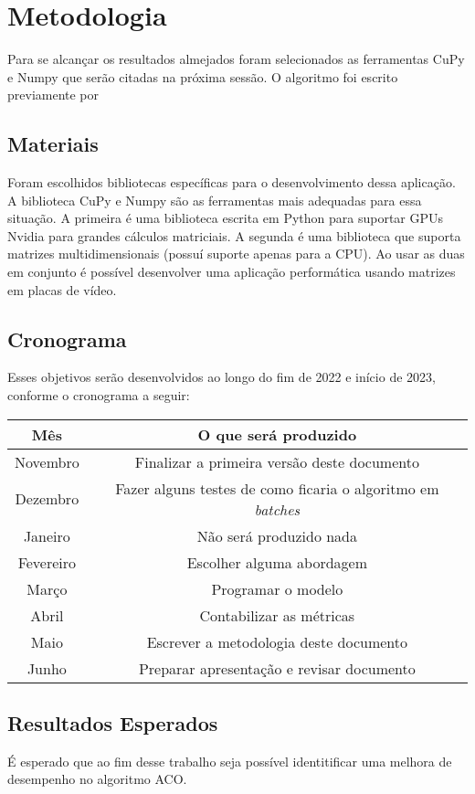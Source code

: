 \section{Metodologia}

Para se alcançar os resultados almejados foram selecionados as ferramentas CuPy e Numpy que serão citadas
na próxima sessão. O algoritmo foi escrito previamente por 

\subsection{Materiais}

Foram escolhidos bibliotecas específicas para o desenvolvimento dessa aplicação.
A biblioteca CuPy\cite{cupyLib} e Numpy\cite{numpyLib} são as ferramentas mais adequadas
para essa situação. A primeira é uma biblioteca escrita em Python para suportar GPUs Nvidia
para grandes cálculos matriciais. A segunda é uma biblioteca que suporta matrizes multidimensionais
(possuí suporte apenas para a CPU). Ao usar as duas em conjunto é possível desenvolver uma aplicação
performática usando matrizes em placas de vídeo.

\subsection{Cronograma}

Esses objetivos serão desenvolvidos ao longo do fim de 2022 e início de 2023, conforme o 
cronograma a seguir:

\begin{center}
    \begin{tabular}{|c|c|}
        \hline
        Mês & O que será produzido \\
        \hline
        Novembro & Finalizar a primeira versão deste documento \\
        \hline
        Dezembro & Fazer alguns testes de como ficaria o algoritmo em \emph{batches} \\
        \hline
        Janeiro & Não será produzido nada \\
        \hline 
        Fevereiro & Escolher alguma abordagem \\
        \hline
        Março & Programar o modelo \\
        \hline
        Abril & Contabilizar as métricas \\
        \hline
        Maio & Escrever a metodologia deste documento \\
        \hline
        Junho & Preparar apresentação e revisar documento \\
        \hline
    \end{tabular}
\end{center}

\subsection{Resultados Esperados}

É esperado que ao fim desse trabalho seja possível identitificar uma melhora de desempenho
no algoritmo ACO.